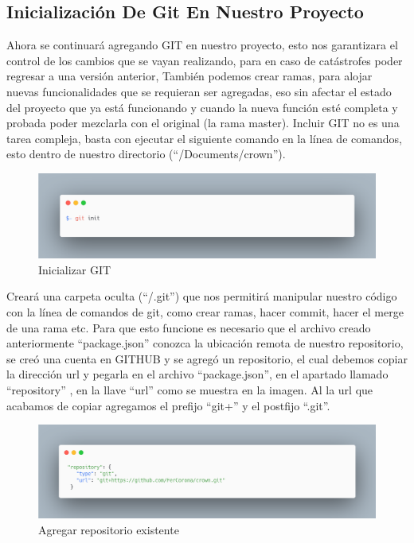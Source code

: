     \subsection{Inicialización De Git En Nuestro Proyecto }
    Ahora se continuará agregando GIT en nuestro proyecto, esto nos garantizara el control de los cambios que se vayan realizando, para en caso de catástrofes poder regresar a una versión anterior, También podemos crear ramas,  para alojar nuevas funcionalidades que se requieran ser agregadas, eso sin afectar el estado del proyecto que ya está funcionando y cuando la nueva función esté completa y probada poder mezclarla con el original (la rama master).
    Incluir GIT no es una tarea compleja, basta con ejecutar el siguiente comando en la línea de comandos, esto dentro de nuestro directorio (“/Documents/crown”).
    \newline
    \newline
     \begin{figure}[H]
    \includegraphics[width=1\textwidth]{./Imagenes/image35.png}
     \caption[Inicializar GIT]{Inicializar GIT}
         \end{figure}
    \newline
    \newline
    Creará una carpeta oculta (“/.git”) que nos permitirá manipular nuestro código con la línea de comandos de git, como crear ramas, hacer commit, hacer el merge de una rama etc.
    Para que esto funcione es necesario que el archivo creado anteriormente “package.json” conozca la ubicación remota de nuestro repositorio, se creó una cuenta en GITHUB  y se agregó un repositorio, el cual debemos copiar la dirección url y pegarla en el archivo “package.json”,  en el apartado llamado “repository” , en la llave “url” como se muestra en la imagen.
    Al la url que acabamos de copiar agregamos el prefijo “git+” y el postfijo “.git”.
    \newline
    \newline
     \begin{figure}[H]
    \includegraphics[width=1\textwidth]{./Imagenes/image4.png}
     \caption[Agregar repositorio existente]{Agregar repositorio existente}
         \end{figure}
    \newline
    \newline
    
